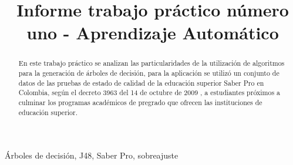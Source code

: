 \documentclass[11pt,conference]{IEEEtran}
\begin{document}
\pagestyle{empty}  


\title{Informe trabajo práctico número uno - Aprendizaje Automático}

\author{
\and
{}
}

\maketitle

\begin{abstract}

En este trabajo práctico se analizan las particularidades de la utilización de
algoritmos para la generación de árboles de decisión, para la aplicación se utilizó un conjunto de datos
de las pruebas de estado de calidad de la educación
superior Saber Pro en Colombia, según el decreto 3963 del 14 de octubre de 2009 \cite{men2009},
a estudiantes próximos a culminar los programas académicos de pregrado que ofrecen las instituciones
de educación superior.
\end{abstract}
 


\begin{IEEEkeywords}
Árboles de decisión, J48, Saber Pro, sobreajuste
\end{IEEEkeywords}

\thispagestyle{empty} 

\IEEEpeerreviewmaketitle













\ifCLASSOPTIONcaptionsoff
  \newpage
\fi





\end{document}
